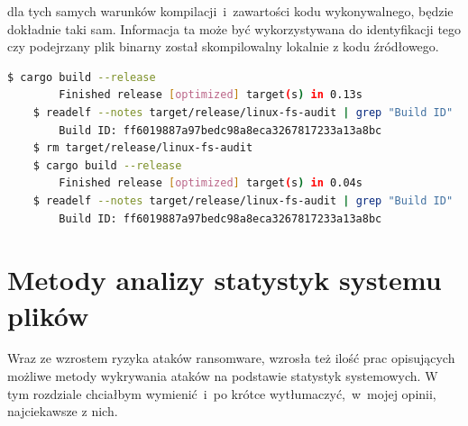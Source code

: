 dla tych samych warunków kompilacji~i~zawartości kodu wykonywalnego, będzie dokładnie taki sam. Informacja ta może być wykorzystywana do
identyfikacji tego czy podejrzany plik binarny został skompilowalny lokalnie z kodu źródłowego.
\newpage
\begin{lstlisting}[language=bash,
    backgroundcolor=\color{EEGold!5!white},
    caption={Test rekompilacji aplikacji napisanej w języku Rust. Mimo ponownej kompilacji, przy braku zmiany kodu źródłowego, identyfikator pozostał ten sam.
    Można więc z dużą pewnością stwierdzić, że plik wykonywalny był skompilowalny na tej maszynie, a nie pobrany z internetu.},
    label={lst:helloC}]
    $ cargo build --release
        Finished release [optimized] target(s) in 0.13s
    $ readelf --notes target/release/linux-fs-audit | grep "Build ID"
        Build ID: ff6019887a97bedc98a8eca3267817233a13a8bc
    $ rm target/release/linux-fs-audit
    $ cargo build --release
        Finished release [optimized] target(s) in 0.04s
    $ readelf --notes target/release/linux-fs-audit | grep "Build ID"
        Build ID: ff6019887a97bedc98a8eca3267817233a13a8bc
\end{lstlisting}
\section{Metody analizy statystyk systemu plików}
\label{sec:metody}
Wraz ze wzrostem ryzyka ataków ransomware, wzrosła też ilość prac opisujących możliwe metody wykrywania ataków
na podstawie statystyk systemowych. W tym rozdziale chciałbym wymienić~i~po krótce wytłumaczyć,~w~mojej opinii, najciekawsze z nich.
